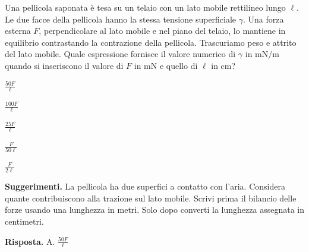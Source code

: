 \documentclass[11pt,a4paper]{article}
\begin{document}
\begin{samepage}
\par\smallskip
Una pellicola saponata è tesa su un telaio con un lato mobile rettilineo lungo \(\ell\). Le due facce della pellicola hanno la stessa tensione superficiale \(\gamma\). Una forza esterna \(F\), perpendicolare al lato mobile e nel piano del telaio, lo mantiene in equilibrio contrastando la contrazione della pellicola. Trascuriamo peso e attrito del lato mobile. Quale espressione fornisce il valore numerico di \(\gamma\) in \(\mathrm{mN/m}\) quando si inseriscono il valore di \(F\) in \(\mathrm{mN}\) e quello di \(\ell\) in \(\mathrm{cm}\)?\par


\begin{list}{}{\setlength{\leftmargin}{1.4em}\setlength{\itemsep}{.1em}\setlength{\parsep}{0pt}}\small
\item[A.] \(\frac{50F}{\ell}\)
\item[B.] \(\frac{100F}{\ell}\)
\item[C.] \(\frac{25F}{\ell}\)
\item[D.] \(\frac{F}{50\ell}\)
\item[E.] \(\frac{F}{2\ell}\)
\end{list}
{\small\textbf{Suggerimenti.} La pellicola ha due superfici a contatto con l’aria. Considera quante contribuiscono alla trazione sul lato mobile. Scrivi prima il bilancio delle forze usando una lunghezza in metri. Solo dopo converti la lunghezza assegnata in centimetri.\par}
\medskip\noindent\textbf{Risposta.} A. \(\frac{50F}{\ell}\)\par


\end{samepage}
\end{document}
